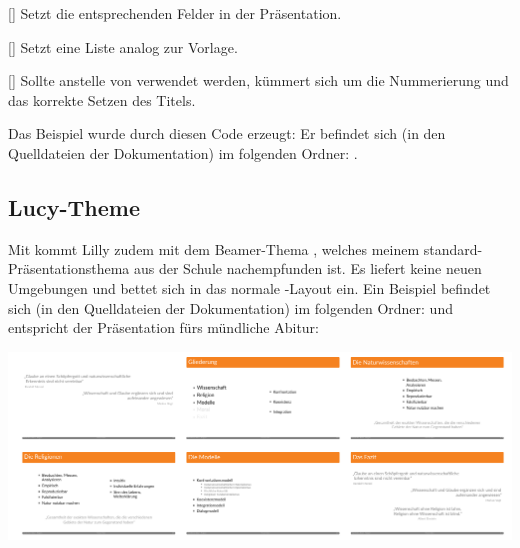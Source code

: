 %
%
%

[\cmdlist{}\cmdlist{}\secline{}\cmdlist{}\cmdlist{}\cmdlist\secline{}\cmdlist{}\cmdlist\secline{}\cmdlist{}\cmdlist\secline{}\cmdlist{}\cmdlist\secline{}]
Setzt die entsprechenden Felder in der Präsentation.

%
%
%

[]
Setzt eine Liste analog zur Vorlage.

%
%
%

[]
Sollte anstelle von  verwendet werden, kümmert sich um die Nummerierung und das korrekte Setzen des Titels.

\begin{bemerkung}
    Das  Beispiel wurde durch diesen Code erzeugt:
    Er befindet sich (in den Quelldateien der Dokumentation) im folgenden Ordner:  .
\end{bemerkung}

\subsection{Lucy-Theme}
Mit  kommt Lilly zudem mit dem Beamer-Thema , welches meinem standard-Präsentationsthema aus der Schule nachempfunden ist. Es liefert keine neuen Umgebungen und bettet sich in das normale -Layout ein. Ein Beispiel befindet sich (in den Quelldateien der Dokumentation) im folgenden Ordner:  und entspricht der Präsentation fürs mündliche Abitur:
\begin{center}
    \includegraphics[width=\linewidth] {Data/Bilder/lucy-preview.png}
\end{center}

